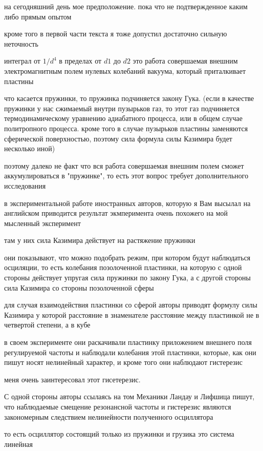 \documentclass[12pt, letterpaper]{article}
\begin{document}
 на сегодняшний день мое предположение. пока что не подтвержденное каким либо прямым опытом

кроме того в первой части текста я тоже допустил достаточно сильную неточность

интеграл от $1/d^4$ в пределах от $d1$ до $d2$ это работа совершаемая внешним электромагнитным полем нулевых колебаний вакуума, который приталкивает пластины

что касается пружинки, то пружинка подчиняется закону Гука. (если в качестве пружинки у нас сжимаемый внутри пузырьков газ, то этот газ подчиняется термодинамическому уравнению адиабатного процесса, или в общем случае политропного процесса. кроме того в случае пузырьков пластины заменяются сферической поверхностью, поэтому сила формула силы Казимира будет несколько иной)

поэтому далеко не факт что вся работа совершаемая внешним полем сможет аккумулироваться в "пружинке", то есть этот вопрос требует дополнительного исследования

в экспериментальной работе иностранных авторов, которую я Вам высылал на английском приводится результат экмперимента очень похожего на мой мысленный эксперимент

там у них сила Казимира действует на растяжение пружинки

они показывают, что можно подобрать режим, при котором будут наблюдаться осциляции, то есть колебания позолоченной пластинки, на которую с одной стороны действует упругая сила пружинки по закону Гука, а с другой стороны сила Казимира со стороны позолоченной сферы

для случая взаимодействия пластинки со сферой авторы приводят формулу силы Казимира у которой расстояние в знаменателе расстояние между пластинкой не в четвертой степени, а в кубе


в своем эксперименте они раскачивали пластинку приложением внешнего поля регулируемой частоты и наблюдали колебания этой пластинки, которые, как они пишут носят нелинейный характер, и кроме того они наблюдают гистерезис

меня очень заинтересовал этот гисетерезис.

С одной стороны авторы ссылаясь на том Механики Ландау и Лифшица пишут, что наблюдаемые смещение резонансной частоты и гистерезис являются закономерным следствием нелинейности полученного осциллятора

то есть осциллятор состоящий только из пружинки и грузика это система линейная
\end{document}
